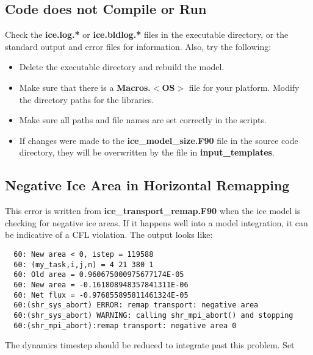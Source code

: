 
\subsection{Code does not Compile or Run }

Check the {\bf ice.log.*} or {\bf ice.bldlog.*} files in the executable 
directory, or the standard output and error files for information.  Also,
try the following:

\begin{itemize}
  \item Delete the executable directory and rebuild the model.
  \item Make sure that there is a {\bf Macros.$<$OS$>$} file for your
        platform.  Modify the directory paths for the libraries.
  \item Make sure all paths and file names are set correctly in the scripts.
  \item If changes were made to the {\bf ice\_model\_size.F90} file in the
        source code directory, they will be overwritten by the file
        in {\bf input\_templates}.  
         
\end{itemize}

\subsection{Negative Ice Area in Horizontal Remapping}

This error is written from {\bf ice\_transport\_remap.F90} when the ice model
is checking for negative ice areas. If it happens well into a model integration,
it can be indicative of a CFL violation.  The output looks like:

\begin{verbatim}
  60: New area < 0, istep = 119588
  60: (my_task,i,j,n) = 4 21 380 1
  60: Old area = 0.960675000975677174E-05
  60: New area = -0.161808948357841311E-06
  60: Net flux = -0.976855895811461324E-05
  60:(shr_sys_abort) ERROR: remap transport: negative area
  60:(shr_sys_abort) WARNING: calling shr_mpi_abort() and stopping
  60:(shr_mpi_abort):remap transport: negative area 0
\end{verbatim}

The dynamics timestep should be reduced to integrate past this problem.  Set

